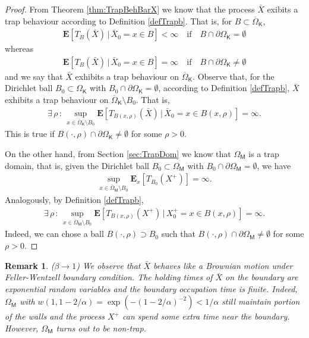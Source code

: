\documentclass[[11pt,a4paper,reqno]{article}
\newtheorem{remark}{Remark}[section]
\numberwithin{equation}{section}
\begin{document}
\begin{proof}
From Theorem \eqref{thm:TrapBehBarX} we know that the process $\bar{X}$ exibits a trap behaviour according to Definition \ref{defTrapb}. That is, for $B \subset \overline{\Omega}_\mathsf{K}$, 
\begin{align*}
\mathbf{E}[T_B(\bar{X})\,| \, \bar{X}_0=x \in B]< \infty \quad \textrm{if} \quad B \cap \partial \Omega_\mathsf{K} = \emptyset
\end{align*}
whereas
\begin{align*}
\mathbf{E}[T_B(\bar{X})\,| \, \bar{X}_0=x \in B] = \infty \quad \textrm{if} \quad B \cap \partial \Omega_\mathsf{K} \neq \emptyset
\end{align*}
and we say that $\bar{X}$ exhibits a trap behaviour on $\overline{\Omega}_\mathsf{K}$. Observe that, for the Dirichlet ball $B_0 \subset \Omega_\mathsf{K}$ with $B_0 \cap \partial \Omega_\mathsf{K} = \emptyset$, according to Definition \ref{defTrapb}, $\bar{X}$ exhibits a trap behaviour on $\overline{\Omega}_\mathsf{K} \setminus B_0$. That is,
\begin{align*}
\exists\, \rho \, :\, \sup_{x \in \overline{\Omega}_\mathsf{K} \setminus B_0} \mathbf{E}[T_{B(x, \rho)} (\bar{X})\, | \, \bar{X}_0=x \in B(x, \rho)] = \infty. 
\end{align*}
This is true if $B(\cdot, \rho) \cap \partial \Omega_\mathsf{K} \neq \emptyset$ for some $\rho >0$. 

On the other hand, from Section \ref{sec:TrapDom} we know that $\Omega_\mathsf{M}$ is a trap domain, that is, given the Dirichlet ball $B_0 \subset \Omega_\mathsf{M}$ with $B_0 \cap \partial \Omega_\mathsf{M}= \emptyset$, we have 
\begin{align*}
\sup_{x \in \bar{\Omega}_\mathsf{M} \setminus B_0} \mathbf{E}_x[T_{B_0}(X^+)] = \infty.
\end{align*} 
Analogously, by Definition \ref{defTrapb},
\begin{align*}
\exists\, \rho \, :\, \sup_{x \in \overline{\Omega}_\mathsf{M} \setminus B_0} \mathbf{E}[T_{B(x, \rho)} (X^+)\, | \, X^+_0=x \in B(x, \rho)] = \infty.
\end{align*}
Indeed, we can chose a ball $B(\cdot, \rho) \supset B_0$ such that $B(\cdot, \rho) \cap \partial \Omega_\mathsf{M} \neq \emptyset$ for some $\rho >0$.
\end{proof}





\begin{remark}
($\beta\to 1$) We observe that $\bar{X}$ behaves like a Brownian motion under Feller-Wentzell boundary condition. The holding times of $\bar{X}$ on the boundary are exponential random variables and the boundary occupation time is finite. Indeed, $\Omega_\mathsf{M}$ with $w(1, 1-2/\alpha) = \exp(-(1-2/\alpha)^{-2}) < 1/\alpha$ still maintain portion of the walls and the process $X^+$ can spend some extra time near the boundary. However, $\Omega_\mathsf{M}$ turns out to be non-trap.
\end{remark}
\end{document}
